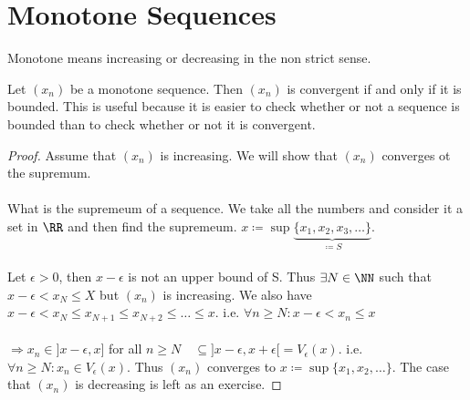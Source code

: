 \documentclass[class=scrartcl, crop=false]{standalone}
\date{10-23}
\begin{document}
\section{Monotone Sequences} 
\begin{recall}
  Monotone means increasing or decreasing in the non strict sense.
\end{recall}
\begin{theorem}
  Let $(x_n)$ be a monotone sequence. Then $(x_n)$ is convergent if and only if it is bounded. This is useful because it is easier to check whether or not a sequence is bounded than to check whether or not it is convergent.
  \begin{proof}
    Assume that $(x_n)$ is increasing. We will show that $(x_n)$ converges ot the supremum.
    \\\\
    What is the supremeum of a sequence. We take all the numbers and consider it a set in $\RR$ and then find the supremeum. $x \coloneqq \sup \underbrace{\{x_1, x_2, x_3, \dots\}}_{\coloneqq S}$.
    \\\\
    Let $\epsilon > 0$, then $x - \epsilon$ is not an upper bound of S. Thus $\exists N \in \NN$ such that $x - \epsilon < x_N \leq X$ but $(x_n)$ is increasing. We also have $x - \epsilon < x_N \leq x_{N + 1} \leq x_{N + 2} \leq \dots \leq x$. i.e. $\forall n \geq N : x - \epsilon < x_n \leq x$ 
    \\\\
    $\Rightarrow x_n \in ]x - \epsilon, x]$ for all $n \geq N \quad \subseteq ]x - \epsilon, x + \epsilon[ = V_\epsilon(x)$. i.e. $\forall n \geq N : x_n \in V_\epsilon(x)$. Thus $(x_n)$ converges to $x \coloneqq \sup \{x_1, x_2, \dots\}$. The case that $(x_n)$ is decreasing is left as an exercise.
  \end{proof}
\end{theorem}
\end{document}
